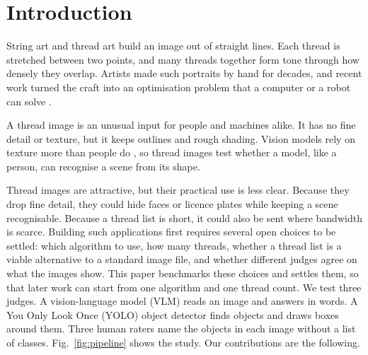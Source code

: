 \documentclass[conference]{IEEEtran}
\begin{document}
\section{Introduction}

String art and thread art build an image out of straight lines. Each thread is stretched between two points, and many threads together form tone through how densely they overlap. Artists made such portraits by hand for decades, and recent work turned the craft into an optimisation problem that a computer or a robot can solve \cite{birsak2018,demoussel2022,nehring2023}.

A thread image is an unusual input for people and machines alike. It has no fine detail or texture, but it keeps outlines and rough shading. Vision models rely on texture more than people do \cite{geirhos2019texture}, so thread images test whether a model, like a person, can recognise a scene from its shape.

Thread images are attractive, but their practical use is less clear. Because they drop fine detail, they could hide faces or licence plates while keeping a scene recognisable. Because a thread list is short, it could also be sent where bandwidth is scarce. Building such applications first requires several open choices to be settled: which algorithm to use, how many threads, whether a thread list is a viable alternative to a standard image file, and whether different judges agree on what the images show. This paper benchmarks these choices and settles them, so that later work can start from one algorithm and one thread count. We test three judges. A vision-language model (VLM) reads an image and answers in words. A You Only Look Once (YOLO) object detector \cite{tian2025} finds objects and draws boxes around them. Three human raters name the objects in each image without a list of classes. Fig.~\ref{fig:pipeline} shows the study. Our contributions are the following.
\end{document}
